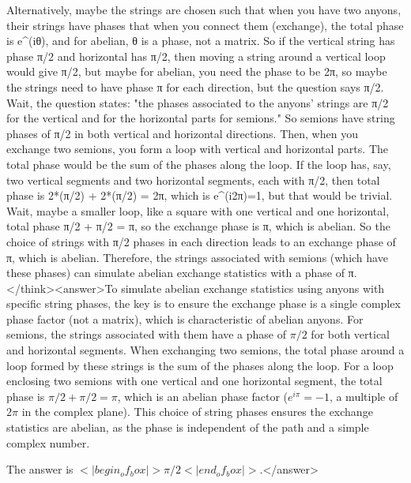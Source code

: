 Alternatively, maybe the strings are chosen such that when you have two anyons, their strings have phases that when you connect them (exchange), the total phase is e^(iθ), and for abelian, θ is a phase, not a matrix. So if the vertical string has phase π/2 and horizontal has π/2, then moving a string around a vertical loop would give π/2, but maybe for abelian, you need the phase to be 2π, so maybe the strings need to have phase π for each direction, but the question says π/2. Wait, the question states: "the phases associated to the anyons' strings are π/2 for the vertical and for the horizontal parts for semions." So semions have string phases of π/2 in both vertical and horizontal directions. Then, when you exchange two semions, you form a loop with vertical and horizontal parts. The total phase would be the sum of the phases along the loop. If the loop has, say, two vertical segments and two horizontal segments, each with π/2, then total phase is 2*(π/2) + 2*(π/2) = 2π, which is e^(i2π)=1, but that would be trivial. Wait, maybe a smaller loop, like a square with one vertical and one horizontal, total phase π/2 + π/2 = π, so the exchange phase is π, which is abelian. So the choice of strings with π/2 phases in each direction leads to an exchange phase of π, which is abelian. Therefore, the strings associated with semions (which have these phases) can simulate abelian exchange statistics with a phase of π.</think><answer>To simulate abelian exchange statistics using anyons with specific string phases, the key is to ensure the exchange phase is a single complex phase factor (not a matrix), which is characteristic of abelian anyons. For semions, the strings associated with them have a phase of \( \pi/2 \) for both vertical and horizontal segments. When exchanging two semions, the total phase around a loop formed by these strings is the sum of the phases along the loop. For a loop enclosing two semions with one vertical and one horizontal segment, the total phase is \( \pi/2 + \pi/2 = \pi \), which is an abelian phase factor (\( e^{i\pi} = -1 \), a multiple of \( 2\pi \) in the complex plane). This choice of string phases ensures the exchange statistics are abelian, as the phase is independent of the path and a simple complex number.  

The answer is \(<|begin_of_box|>\pi/2<|end_of_box|>\).</answer>